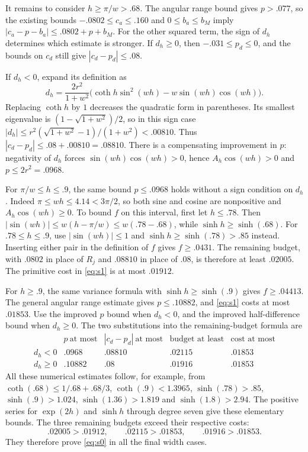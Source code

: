 It remains to consider $h\ge\pi/w>.68$. The angular range bound gives $p>.077$, so the existing bounds $-.0802\le c_a\le.160$ and $0\le b_a\le b_M$ imply $|c_a-p-b_a|\le.0802+p+b_M$. For the other squared term, the sign of $d_h$ determines which estimate is stronger. If $d_h\ge0$, then $-.031\le p_d\le0$, and the bounds on $c_d$ still give $|c_d-p_d|\le.08$.

If $d_h<0$, expand its definition as
\[
 d_h=\frac{2r^2}{1+w^2}
       \bigl(\coth h\sin^2(wh)-w\sin(wh)\cos(wh)\bigr).
\]
Replacing $\coth h$ by $1$ decreases the quadratic form in parentheses. Its smallest eigenvalue is $(1-\sqrt{1+w^2})/2$, so in this sign case $|d_h|\le r^2(\sqrt{1+w^2}-1)/(1+w^2)<.00810$. Thus $|c_d-p_d|\le.08+.00810=.08810$. There is a compensating improvement in $p$: negativity of $d_h$ forces $\sin(wh)\cos(wh)>0$, hence $A_h\cos(wh)>0$ and $p\le2r^2=.0968$.

For $\pi/w\le h\le.9$, the same bound $p\le.0968$ holds without a sign condition on $d_h$. Indeed $\pi\le wh\le4.14<3\pi/2$, so both sine and cosine are nonpositive and $A_h\cos(wh)\ge0$. To bound $f$ on this interval, first let $h\le.78$. Then $|\sin(wh)|\le w(h-\pi/w)\le w(.78-.68)$, while $\sinh h\ge\sinh(.68)$. For $.78\le h\le.9$, use $|\sin(wh)|\le1$ and $\sinh h\ge\sinh(.78)>.85$ instead. Inserting either pair in the definition of $f$ gives $f\ge.0431$. The remaining budget, with $.0802$ in place of $R_j$ and $.08810$ in place of $.08$, is therefore at least $.02005$. The primitive cost in \eqref{eq:s1} is at most $.01912$.

For $h\ge.9$, the same variance formula with $\sinh h\ge\sinh(.9)$ gives $f\ge.04413$. The general angular range estimate gives $p\le.10882$, and \eqref{eq:s1} costs at most $.01853$. Use the improved $p$ bound when $d_h<0$, and the improved half-difference bound when $d_h\ge0$. The two substitutions into the remaining-budget formula are
\[
\begin{array}{c|cc|cc}
 &p\ \text{at most}&|c_d-p_d|\ \text{at most}
 &\text{budget at least}&\text{cost at most}\\\hline
 d_h<0&.0968&.08810&.02115&.01853\\
 d_h\ge0&.10882&.08&.01916&.01853
\end{array}
\]
All these numerical estimates follow, for example, from $\coth(.68)\le1/.68+.68/3$, $\coth(.9)<1.3965$, $\sinh(.78)>.85$, $\sinh(.9)>1.024$, $\sinh(1.36)>1.819$ and $\sinh(1.8)>2.94$. The positive series for $\exp(2h)$ and $\sinh h$ through degree seven give these elementary bounds. The three remaining budgets exceed their respective costs:
\[
 .02005>.01912,\qquad .02115>.01853,\qquad .01916>.01853.
\]
They therefore prove \eqref{eq:s0} in all the final width cases.

